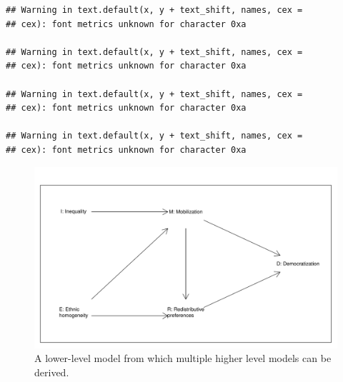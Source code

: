 \documentclass[
  12pt,
]{book}
\begin{document}
\begin{verbatim}
## Warning in text.default(x, y + text_shift, names, cex =
## cex): font metrics unknown for character 0xa

## Warning in text.default(x, y + text_shift, names, cex =
## cex): font metrics unknown for character 0xa

## Warning in text.default(x, y + text_shift, names, cex =
## cex): font metrics unknown for character 0xa

## Warning in text.default(x, y + text_shift, names, cex =
## cex): font metrics unknown for character 0xa
\end{verbatim}

\begin{figure}

{\centering \includegraphics[width=.5\textwidth]{ii_files/figure-latex/lowercomplexdem-1} 

}

\caption{A lower-level model  from which multiple higher level models can be derived.}\label{fig:lowercomplexdem}
\end{figure}
\end{document}
